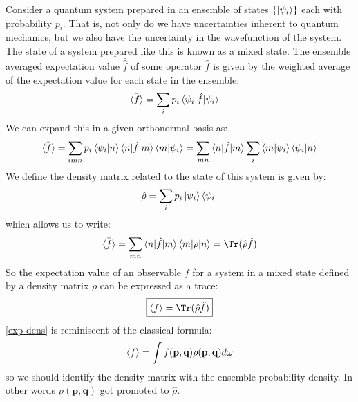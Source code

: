 \documentclass[a4paper,11pt,oneside]{book}
\begin{document}
Consider a quantum system prepared in an ensemble of states $\{\ket{\psi_i}\}$ each with probability $p_i$. That is, not only do we have uncertainties inherent to quantum mechanics, but we also have the uncertainty in the wavefunction of the system. The state of a system prepared like this is known as a mixed state. The ensemble averaged expectation value $\bar{\hat{f}}$ of some operator $\hat{f}$ is given by the weighted average of the expectation value for each state in the ensemble:
\begin{align}
    \bar{\braket{f}} &= \sum_i p_i \braket{\psi_i|\hat{f}|\psi_i}
\end{align}
We can expand this in a given orthonormal basis as:
\begin{equation}
     \bar{\braket{f}} = \sum_{imn} p_i \braket{\psi_i|n}\braket{n|\hat{f}|m}\braket{m|\psi_i} = \sum_{mn} \braket{n|\hat{f}|m} \sum_i \braket{m|\psi_i}\braket{\psi_i|n}
\end{equation}
We define the density matrix related to the state of this system is given by:
\begin{equation}
    \hat{\rho} = \sum_i p_i \ket{\psi_i}\bra{\psi_i}
\end{equation}
which allows us to write:
\begin{equation}\label{exp dens}
    \Bar{\braket{f}}  = \sum_{mn} \braket{n|\hat{f}|m} \braket{m|\rho|n} = \Tr (\hat{\rho} \hat{f})
\end{equation}
So the expectation value of an observable $f$ for a system in a mixed state defined by a density matrix $\rho$ can be expressed as a trace:
\begin{equation}
    \boxed{\Bar{\braket{f}} = \Tr (\hat{\rho} \hat{f})}
\end{equation}
\eqref{exp dens} is reminiscent of the classical formula:
\begin{equation}
    \braket{f} = \int f(\textbf{p},\textbf{q}) \rho(\textbf{p},\textbf{q}) d\omega
\end{equation}
so we should identify the density matrix with the ensemble probability density. In other words $\rho(\textbf{p},\textbf{q})$ got promoted to $\hat{\rho}$. 
\end{document}
